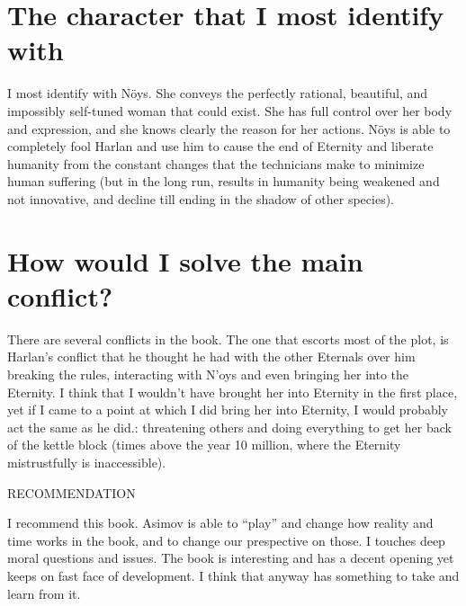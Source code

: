 \documentclass[]{article}
\begin{document}
        \begin{multicols}{2}
        \section{The character that I most identify with}
        {\sf I most identify with N\"oys. She conveys the perfectly rational, beautiful, and impossibly self-tuned woman that could exist. She has full control over her body and expression, and she knows clearly the reason for her actions. N\"oys is able to completely fool Harlan and use him to cause the end of Eternity and liberate humanity from the constant changes that the technicians make to minimize human suffering (but in the long run, results in humanity being weakened and not innovative, and decline till ending in the shadow of other species).}
        \vfill\null 
        
        \columnbreak 
        \section{How would I solve the main conflict?}
        {\sf There are several conflicts in the book. The one that escorts most of the plot, is Harlan's conflict that he thought he had with the other Eternals over him breaking the rules, interacting with N'oys and even bringing her into the Eternity. I think that I wouldn't have brought her into Eternity in the first place, yet if I came to a point at which I did bring her into Eternity, I would probably act the same as he did.: threatening others and doing everything to get her back of the kettle block (times above the year 10 million, where the Eternity mistrustfully is inaccessible). }
        \vfill\null
    \end{multicols}
    \dotfill
     \vspace{2pt} \newline \hfil \large \filleft \filright \fontsize{20}{40} RECOMMENDATION
    
    \normalsize
    {\sf I recommend this book. Asimov is able to ``play'' and change how reality and time works in the book, and to change our prespective on those. I touches deep moral questions and issues. The book is interesting and has a decent opening yet keeps on fast face of development. I think that anyway has something to take and learn from it. }
    
    \dotfill
    
\end{document}
